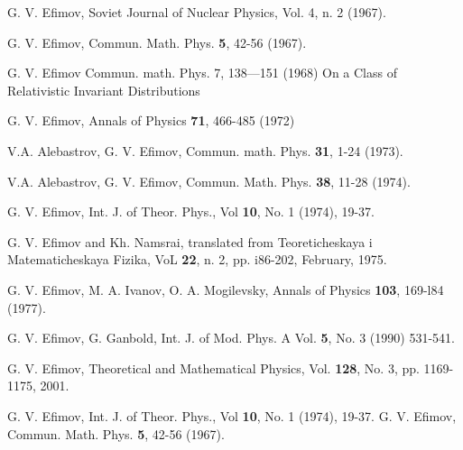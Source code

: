 \documentclass[a4paper,11pt]{article}
\begin{document}
\begin{thebibliography}{99}







G. V. Efimov, Soviet Journal of Nuclear Physics, Vol. {4}, n. 2 (1967).

G. V. Efimov, 
Commun. Math. Phys. {\bf 5}, 42-56 (1967).

G. V. Efimov
Commun. math. Phys. 7, 138—151 (1968)
On a Class of Relativistic Invariant Distributions

G. V. Efimov,
Annals of Physics {\bf 71}, 466-485 (1972)


V.A. Alebastrov, G. V. Efimov, 
Commun. math. Phys. {\bf 31}, 1-24 (1973).


 V.A. Alebastrov, G. V. Efimov,
Commun. Math. Phys. {\bf 38}, 11-28 (1974).


 G. V. Efimov, Int. J. of Theor. Phys., Vol {\bf 10}, No. 1 (1974), 19-37. 




G. V. Efimov and Kh. Namsrai, translated from
Teoreticheskaya i Matematicheskaya  
Fizika, VoL {\bf 22}, n. 2, pp. i86-202, February, 1975.

G. V. Efimov, M. A. Ivanov, O. A. Mogilevsky, Annals of Physics {\bf 103}, 169-l84 (1977).


 G. V. Efimov, G. Ganbold, Int. J. of Mod. Phys. A Vol. {\bf 5}, No. 3 (1990) 531-541. 


 G. V. Efimov, Theoretical and Mathematical Physics, Vol. {\bf 128}, No. 3, pp. 1169-1175, 2001.  



 G. V. Efimov, Int. J. of Theor. Phys., Vol {\bf 10}, No. 1 (1974), 19-37. G. V. Efimov, 
Commun. Math. Phys. {\bf 5}, 42-56 (1967).




\end{thebibliography}
\end{document}
